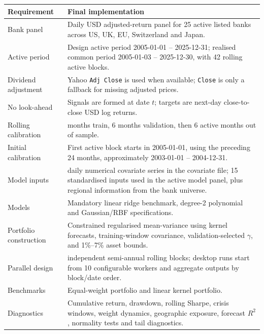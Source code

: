 ﻿\documentclass[10pt,a4paper]{article}
\begin{document}
\begin{table}[H]\centering\small

\begin{tabular}{>{\raggedright\arraybackslash}p{}>{\raggedright\arraybackslash}p{}}

\toprule

Requirement & Final implementation \\

\midrule

Bank panel & Daily USD adjusted-return panel for 25 active listed banks across US, UK, EU, Switzerland and Japan. \\

Active period & Design active period 2005-01-01 -- 2025-12-31; realised common period 2005-01-03 -- 2025-12-30, with 42 rolling active blocks. \\

Dividend adjustment & Yahoo \texttt{Adj Close} is used when available; \texttt{Close} is only a fallback for missing adjusted prices. \\

No look-ahead & Signals are formed at date \(t\); targets are next-day close-to-close USD log returns. \\

Rolling calibration & 18 months train, 6 months validation, then 6 active months out of sample. \\

Initial calibration & First active block starts in 2005-01-01, using the preceding 24 months, approximately 2003-01-01 -- 2004-12-31. \\

Model inputs & 77 daily numerical covariate series in the covariate file; 15 standardised inputs used in the active model panel, plus regional information from the bank universe. \\

Models & Mandatory linear ridge benchmark, degree-2 polynomial and Gaussian/RBF specifications. \\

Portfolio construction & Constrained regularised mean-variance using kernel forecasts, training-window covariance, validation-selected \(\gamma\), and 1\%--7\% asset bounds. \\

Parallel design & 42 independent semi-annual rolling blocks; desktop runs start from 10 configurable workers and aggregate outputs by block/date order. \\

Benchmarks & Equal-weight portfolio and linear kernel portfolio. \\

Diagnostics & Cumulative return, drawdown, rolling Sharpe, crisis windows, weight dynamics, geographic exposure, forecast \(R^2\), normality tests and tail diagnostics. \\

\bottomrule

\end{tabular}

\end{table}
\end{document}
